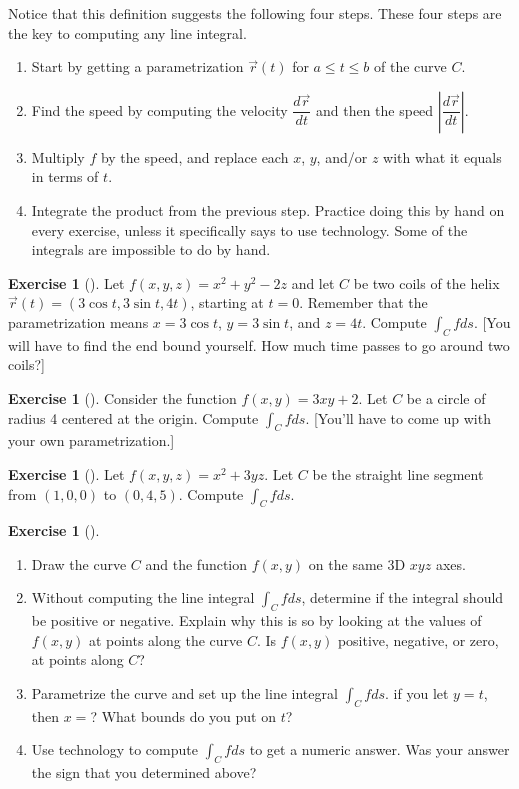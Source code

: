 \documentclass[10pt,]{book}
\theoremstyle{plain}
\theoremstyle{definition}
\theoremstyle{definition}
\theoremstyle{definition}
\theoremstyle{definition}
\newtheorem{exploration}[project]{Exercise}
\theoremstyle{definition}
\numberwithin{equation}{section}
\begin{document}
Notice that this definition suggests the following four steps. These four steps are the key to computing any line integral.  \leavevmode%
\begin{enumerate}
\item\hypertarget{li-141}{}Start by getting a parametrization \(\vec r(t)\) for \(a\leq t\leq b\) of the curve \(C\).%
\item\hypertarget{li-142}{}Find the speed by computing the velocity \(\dfrac{d\vec r}{dt}\) and then the speed \(\left|\dfrac{d\vec r}{dt}\right|\).%
\item\hypertarget{li-143}{}Multiply \(f\) by the speed, and replace each \(x\), \(y\), and/or \(z\) with what it equals in terms of \(t\).%
\item\hypertarget{li-144}{}Integrate the product from the previous step. Practice doing this by hand on every exercise, unless it specifically says to use technology. Some of the integrals are impossible to do by hand.%
\end{enumerate}
%
\begin{exploration}[]\label{exploration-198}
Let \(f(x,y,z)=x^2+y^2-2z\) and let \(C\) be two coils of the helix \(\vec r(t)=(3\cos t, 3\sin t, 4t)\), starting at \(t=0\). Remember that the parametrization means \(x=3\cos t\), \(y=3\sin t\), and \(z=4t\). Compute \(\int_Cf ds\). [You will have to find the end bound yourself. How much time passes to go around two coils?]%
\end{exploration}
\begin{exploration}[]\label{exploration-199}
Consider the function \(f(x,y)=3xy+2\). Let \(C\) be a circle of radius 4 centered at the origin. Compute \(\int_C fds\). [You'll have to come up with your own parametrization.]%
\end{exploration}
\begin{exploration}[]\label{exploration-200}
Let \(f(x,y,z)=x^2+3yz\). Let \(C\) be the straight line segment from \((1,0,0)\) to \((0,4,5)\). Compute \(\int_C f ds\).%
\end{exploration}
\begin{exploration}[]\label{exploration-201}
\leavevmode%
\begin{enumerate}[font=\bfseries,label=(\alph*),ref=\alph*]
\item\label{task-504} Draw the curve \(C\) and the function \(f(x,y)\) on the same 3D \(xyz\) axes.%
\item\label{task-505} Without computing the line integral \(\int_C fds\), determine if the integral should be positive or negative. Explain why this is so by looking at the values of \(f(x,y)\) at points along the curve \(C\).  Is \(f(x,y)\) positive, negative, or zero, at points along \(C\)?%
\item\label{task-506} Parametrize the curve and set up the line integral \(\int_C f ds\). if you let \(y=t\), then \(x=\)? What bounds do you put on \(t\)?%
%
\item\label{task-507} Use technology to compute \(\int_C fds\) to get a numeric answer.  Was your answer the sign that you determined above?%
\end{enumerate}
\end{exploration}
\end{document}
